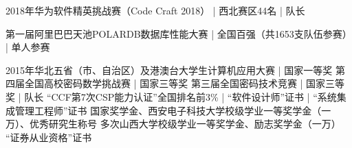 \documentclass[zh]{resume}
\begin{document}
\begin{entries}

    {2018年华为软件精英挑战赛（Code Craft 2018）  \quad | \quad 西北赛区44名  \quad | \quad 队长}%

    {第一届阿里巴巴天池POLARDB数据库性能大赛  \quad | \quad 全国百强（共1653支队伍参赛）  \quad | \quad 单人参赛}%

    {2015年华北五省（市、自治区）及港澳台大学生计算机应用大赛  \quad | \quad 国家一等奖 }%
    {第四届全国高校密码数学挑战赛  \quad | \quad 国家三等奖}%
    {第三届全国密码技术竞赛  \quad | \quad 国家三等奖  \quad | \quad 队长  \quad {}}%
    {“CCF第7次CSP能力认证”全国排名前3\% | “软件设计师”证书 | “系统集成管理工程师”证书}
    {国家奖学金、西安电子科技大学校级学业一等奖学金（一万）、优秀研究生称号}
    {多次山西大学校级学业一等奖学金、励志奖学金（一万）}
    {“证券从业资格”证书}
\end{entries}
\end{document}

